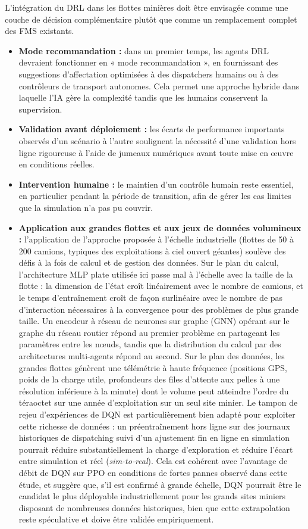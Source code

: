 \documentclass[11pt,a4paper]{article}
\begin{document}
L'intégration du DRL dans les flottes minières doit être envisagée comme une couche de décision complémentaire plutôt que comme un remplacement complet des FMS existants.

\begin{itemize}
  \item \textbf{Mode recommandation :} dans un premier temps, les agents DRL devraient fonctionner en « mode recommandation », en fournissant des suggestions d'affectation optimisées à des dispatchers humains ou à des contrôleurs de transport autonomes. Cela permet une approche hybride dans laquelle l'IA gère la complexité tandis que les humains conservent la supervision.
  \item \textbf{Validation avant déploiement :} les écarts de performance importants observés d'un scénario à l'autre soulignent la nécessité d'une validation hors ligne rigoureuse à l'aide de jumeaux numériques avant toute mise en œuvre en conditions réelles.
  \item \textbf{Intervention humaine :} le maintien d'un contrôle humain reste essentiel, en particulier pendant la période de transition, afin de gérer les cas limites que la simulation n'a pas pu couvrir.
  \item \textbf{Application aux grandes flottes et aux jeux de données volumineux :} l'application de l'approche proposée à l'échelle industrielle (flottes de 50 à 200 camions, typiques des exploitations à ciel ouvert géantes) soulève des défis à la fois de calcul et de gestion des données. Sur le plan du calcul, l'architecture MLP plate utilisée ici passe mal à l'échelle avec la taille de la flotte : la dimension de l'état croît linéairement avec le nombre de camions, et le temps d'entraînement croît de façon surlinéaire avec le nombre de pas d'interaction nécessaires à la convergence pour des problèmes de plus grande taille. Un encodeur à réseau de neurones sur graphe (GNN) opérant sur le graphe du réseau routier répond au premier problème en partageant les paramètres entre les nœuds, tandis que la distribution du calcul par des architectures multi-agents répond au second. Sur le plan des données, les grandes flottes génèrent une télémétrie à haute fréquence (positions GPS, poids de la charge utile, profondeurs des files d'attente aux pelles à une résolution inférieure à la minute) dont le volume peut atteindre l'ordre du téraoctet sur une année d'exploitation sur un seul site minier. Le tampon de rejeu d'expériences de DQN est particulièrement bien adapté pour exploiter cette richesse de données : un préentraînement hors ligne sur des journaux historiques de dispatching suivi d'un ajustement fin en ligne en simulation pourrait réduire substantiellement la charge d'exploration et réduire l'écart entre simulation et réel (\textit{sim-to-real}). Cela est cohérent avec l'avantage de débit de DQN sur PPO en conditions de fortes pannes observé dans cette étude, et suggère que, s'il est confirmé à grande échelle, DQN pourrait être le candidat le plus déployable industriellement pour les grands sites miniers disposant de nombreuses données historiques, bien que cette extrapolation reste spéculative et doive être validée empiriquement.
\end{itemize}
\end{document}
